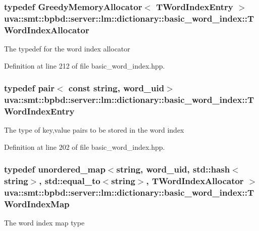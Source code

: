 \subsubsection[{T\+Word\+Index\+Allocator}]{\setlength{\rightskip}{0pt plus 5cm}typedef {\bf Greedy\+Memory\+Allocator}$<$ {\bf T\+Word\+Index\+Entry} $>$ {\bf uva\+::smt\+::bpbd\+::server\+::lm\+::dictionary\+::basic\+\_\+word\+\_\+index\+::\+T\+Word\+Index\+Allocator}}\label{classuva_1_1smt_1_1bpbd_1_1server_1_1lm_1_1dictionary_1_1basic__word__index_a056edf8ef4a61b1cfde2f2269437f6d5}
The typedef for the word index allocator 

Definition at line 212 of file basic\+\_\+word\+\_\+index.\+hpp.

\hypertarget{classuva_1_1smt_1_1bpbd_1_1server_1_1lm_1_1dictionary_1_1basic__word__index_a61bd773bb1c79c5be7679fc557f27747}{}
\subsubsection[{T\+Word\+Index\+Entry}]{\setlength{\rightskip}{0pt plus 5cm}typedef pair$<$ const string, {\bf word\+\_\+uid}$>$ {\bf uva\+::smt\+::bpbd\+::server\+::lm\+::dictionary\+::basic\+\_\+word\+\_\+index\+::\+T\+Word\+Index\+Entry}}\label{classuva_1_1smt_1_1bpbd_1_1server_1_1lm_1_1dictionary_1_1basic__word__index_a61bd773bb1c79c5be7679fc557f27747}
The type of key,value pairs to be stored in the word index 

Definition at line 202 of file basic\+\_\+word\+\_\+index.\+hpp.

\hypertarget{classuva_1_1smt_1_1bpbd_1_1server_1_1lm_1_1dictionary_1_1basic__word__index_ab58bffa80202cb71ba13ba19814b622c}{}
\subsubsection[{T\+Word\+Index\+Map}]{\setlength{\rightskip}{0pt plus 5cm}typedef unordered\+\_\+map$<$string, {\bf word\+\_\+uid}, std\+::hash$<$string$>$, std\+::equal\+\_\+to$<$string$>$, {\bf T\+Word\+Index\+Allocator} $>$ {\bf uva\+::smt\+::bpbd\+::server\+::lm\+::dictionary\+::basic\+\_\+word\+\_\+index\+::\+T\+Word\+Index\+Map}}\label{classuva_1_1smt_1_1bpbd_1_1server_1_1lm_1_1dictionary_1_1basic__word__index_ab58bffa80202cb71ba13ba19814b622c}
The word index map type 

